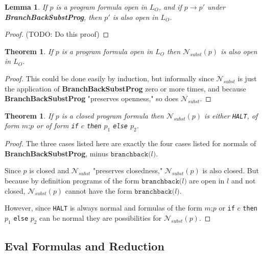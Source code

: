 \documentclass[11pt]{article}
\begin{document}
\newtheorem*{bbppreservesopenness}{Lemma}
\begin{bbppreservesopenness}
If $p$ is a program formula open in $L_{O}$, and if $p \longrightarrow p'$ under \textbf{BranchBackSubstProg}, then $p'$ is also open in $L_{O}$.
\end{bbppreservesopenness}
\begin{proof}
(TODO: Do this proof)
\end{proof}

\newtheorem*{nsubstpreservesopenness}{Theorem}
\begin{nsubstpreservesopenness}
If $p$ is a program formula open in $L_{O}$ then $\mathcal{N}_{subst}(p)$ is also open in $L_{O}$.
\end{nsubstpreservesopenness}
\begin{proof}
This could be done easily by induction, but informally since $\mathcal{N}_{subst}$ is just the application of \textbf{BranchBackSubstProg} zero or more times, and because \textbf{BranchBackSubstProg} "preserves openness," so does $\mathcal{N}_{subst}$.
\end{proof}

\newtheorem*{openformulanormalforms}{Theorem}
\begin{openformulanormalforms}
If $p$ is a closed program formula then $\mathcal{N}_{subst}(p)$ is either \texttt{HALT}, of form $m\texttt{;}p$ or of form \texttt{if} $c$ \texttt{then} $p_{1}$ \texttt{else} $p_{2}$.
\end{openformulanormalforms}

\begin{proof}
The three cases listed here are exactly the four cases listed for normals of \textbf{BranchBackSubstProg}, minus $\texttt{branchback(}l\texttt{)}$.

Since $p$ is closed and $\mathcal{N}_{subst}$ "preserves closedness," $\mathcal{N}_{subst}(p)$ is also closed.  But because by definition programs of the form $\texttt{branchback(}l\texttt{)}$ are open in ${l}$ and not closed, $\mathcal{N}_{subst}(p)$ cannot have the form $\texttt{branchback(}l\texttt{)}$.

However, since \texttt{HALT} is always normal and formulas of the form $m\texttt{;}p$ or \texttt{if} $c$ \texttt{then} $p_{1}$ \texttt{else} $p_{2}$ can be normal they are possibilities for $\mathcal{N}_{subst}(p)$.
\end{proof}

\subsection{Eval Formulas and Reduction}
\end{document}
